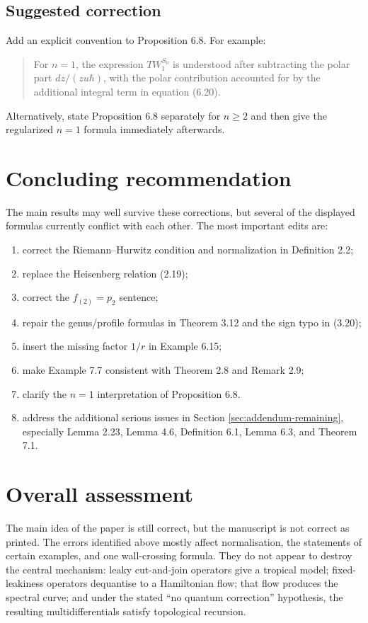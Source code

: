 \documentclass[11pt]{article}
\begin{document}
\subsection*{Suggested correction}
Add an explicit convention to Proposition 6.8.  For example:
\begin{quote}
For $n=1$, the expression $T W^{S_0}_1$ is understood after subtracting the polar part $dz/(z u\hbar)$, with the polar contribution accounted for by the additional integral term in equation (6.20).
\end{quote}
Alternatively, state Proposition 6.8 separately for $n\geq 2$ and then give the regularized $n=1$ formula immediately afterwards.

\section*{Concluding recommendation}

The main results may well survive these corrections, but several of the displayed formulas currently conflict with each other.  The most important edits are:
\begin{enumerate}[label=(\roman*)]
   \item correct the Riemann--Hurwitz condition and normalization in Definition 2.2;
   \item replace the Heisenberg relation (2.19);
   \item correct the $f_{(2)}=p_2$ sentence;
   \item repair the genus/profile formulas in Theorem 3.12 and the sign typo in (3.20);
   \item insert the missing factor $1/r$ in Example 6.15;
   \item make Example 7.7 consistent with Theorem 2.8 and Remark 2.9;
   \item clarify the $n=1$ interpretation of Proposition 6.8.
   \item address the additional serious issues in Section \ref{sec:addendum-remaining}, especially Lemma 2.23, Lemma 4.6, Definition 6.1, Lemma 6.3, and Theorem 7.1.
\end{enumerate}

\section{Overall assessment}\label{sec:assessment}

The main idea of the paper is still correct, but the manuscript is not correct as printed.  The errors identified above mostly affect normalisation, the statements of certain examples, and one wall-crossing formula.  They do not appear to destroy the central mechanism: leaky cut-and-join operators give a tropical model; fixed-leakiness operators dequantise to a Hamiltonian flow; that flow produces the spectral curve; and under the stated ``no quantum correction'' hypothesis, the resulting multidifferentials satisfy topological recursion.
\end{document}
